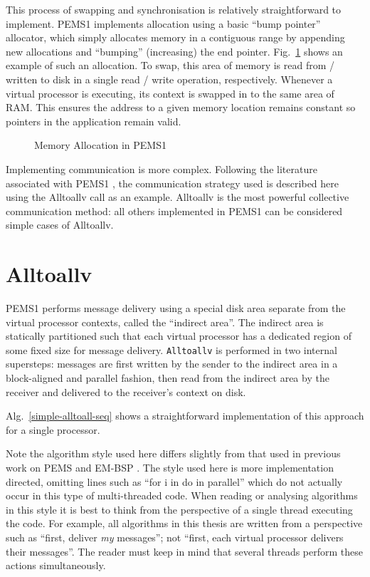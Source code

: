 \documentclass[12pt]{carletoncsthesis}
\begin{document}
This process of swapping and synchronisation is relatively straightforward
to implement.  PEMS1 implements allocation using a basic ``bump pointer''
allocator, which simply allocates memory in a contiguous range by appending
new allocations and ``bumping'' (increasing) the end pointer.
 Fig.~\ref{allocation-fig} shows an example of such an allocation.
To swap, this area of memory is read from / written to disk in a single read
/ write operation, respectively.  Whenever a virtual processor is executing,
its context is swapped in to the same area of RAM.  This ensures the address
to a given memory location remains constant so pointers in the application
remain valid.

\begin{figure}[h]
\begin{center}
\end{center}
\caption{Memory Allocation in PEMS1}
\label{allocation-fig}
\end{figure}

Implementing communication is more complex.  Following the literature
associated with PEMS1 \cite{mnthesis}\cite{experimentswith}, the communication
strategy used is described here using the {\sc Alltoallv} call as an example.
{\sc Alltoallv} is the most powerful collective communication method:
all others implemented in PEMS1 can be considered simple cases of
{\sc Alltoallv}.

\section{Alltoallv}


PEMS1 performs message delivery using a special disk area separate from the
virtual processor contexts, called the ``indirect area''.  The indirect area
is statically partitioned such that each virtual processor has a dedicated
region of some fixed size for message delivery.  {\tt Alltoallv} is performed
in two internal supersteps: messages are first written by the sender to the
indirect area in a block-aligned and parallel fashion, then read from the
indirect area by the receiver and delivered to the receiver's context on disk.

Alg.~\ref{simple-alltoall-seq} shows a straightforward implementation of this
approach for a single processor.

Note the algorithm style used here differs slightly from
that used in previous work on PEMS \cite{mnthesis} and EM-BSP
\cite{dhthesis}\cite{bspem}\cite{emsimulation}.  The style used here is more
implementation directed, omitting lines such as ``for i in  do in
parallel'' which do not actually occur in this type of multi-threaded code.
When reading or analysing algorithms in this style it is best to think from
the perspective of a single thread executing the code.  For example, all
algorithms in this thesis are written from a perspective such as ``first,
deliver {\em my} messages''; not ``first, each virtual processor delivers
their messages''.  The reader must keep in mind that several threads perform
these actions simultaneously.
\end{document}
